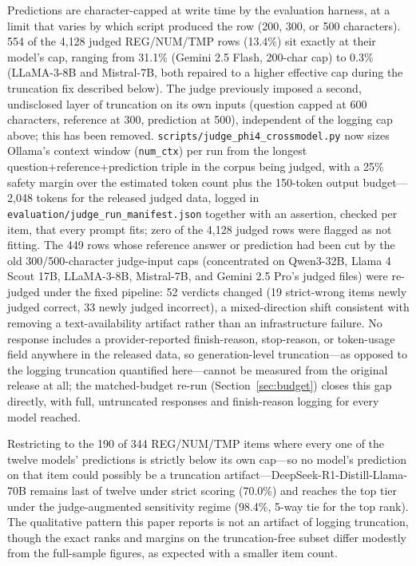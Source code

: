 Predictions are character-capped at write time by the evaluation harness, at a limit that varies by
which script produced the row (200, 300, or 500 characters). 554 of the 4{,}128 judged REG/NUM/TMP
rows (13.4\%) sit exactly at their model's cap, ranging from 31.1\% (Gemini 2.5 Flash, 200-char cap)
to 0.3\% (LLaMA-3-8B and Mistral-7B, both repaired to a higher effective cap during the truncation
fix described below). The judge previously imposed a second, undisclosed layer of truncation on its
own inputs (question capped at 600 characters, reference at 300, prediction at 500), independent of
the logging cap above; this has been removed. \texttt{scripts/judge\_phi4\_crossmodel.py} now sizes
Ollama's context window (\texttt{num\_ctx}) per run from the longest question+reference+prediction
triple in the corpus being judged, with a 25\% safety margin over the estimated token count plus the
150-token output budget---2{,}048 tokens for the released judged data, logged in
\texttt{evaluation/judge\_run\_manifest.json} together with an assertion, checked per item, that every
prompt fits; zero of the 4{,}128 judged rows were flagged as not fitting. The 449 rows whose reference
answer or prediction had been cut by the old 300/500-character judge-input caps (concentrated on
Qwen3-32B, Llama 4 Scout 17B, LLaMA-3-8B, Mistral-7B, and Gemini 2.5 Pro's judged files) were
re-judged under the fixed pipeline: 52 verdicts changed (19 strict-wrong items newly judged correct,
33 newly judged incorrect), a mixed-direction shift consistent with removing a text-availability
artifact rather than an infrastructure failure. No response includes a provider-reported finish-reason,
stop-reason, or token-usage field anywhere in the released data, so generation-level truncation---as
opposed to the logging truncation quantified here---cannot be measured from the original release at
all; the matched-budget re-run (Section~\ref{sec:budget}) closes this gap directly, with full,
untruncated responses and finish-reason logging for every model reached.

Restricting to the 190 of 344 REG/NUM/TMP items where every one of the twelve models' predictions is
strictly below its own cap---so no model's prediction on that item could possibly be a truncation
artifact---DeepSeek-R1-Distill-Llama-70B remains last of twelve under strict scoring (70.0\%) and
reaches the top tier under the judge-augmented sensitivity regime (98.4\%, 5-way tie for the top
rank). The qualitative pattern this paper reports is not an artifact of logging truncation, though
the exact ranks and margins on the truncation-free subset differ modestly from the full-sample
figures, as expected with a smaller item count.

